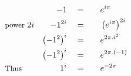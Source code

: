 \begin{alignat*}{5}
&\,&-1\quad&=\quad&&e^{i\pi}\\
&\small\text{power }2i&-1^{2i}\normalsize\quad&=&&\left(e^{i\pi}\right)^{2i}\\
&\,&\left(-1^2\right)^i\quad&=&&e^{2\pi.i^2}\\
&\,&\left(-1^2\right)^i\quad&=&&e^{2\pi.(-1)}\\
&\small\text{Thus}&1^i\quad&=&&e^{-2\pi}
\end{alignat*}
